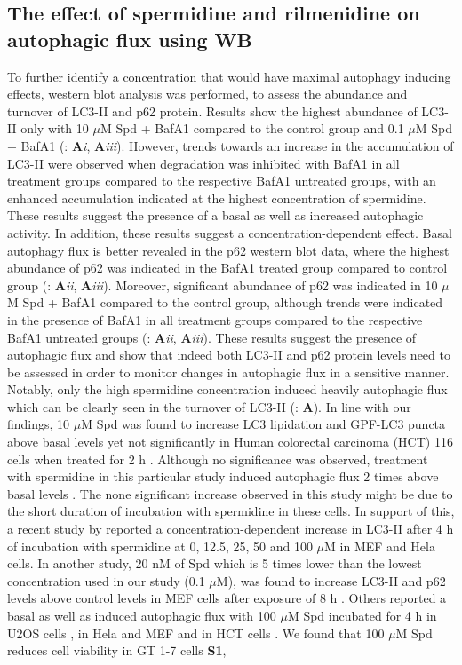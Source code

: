 {\subsection{The effect of spermidine and rilmenidine on autophagic flux using WB}
To further identify a concentration that would have maximal autophagy inducing effects, western blot analysis was performed, to assess the abundance and turnover of LC3-II and p62 protein. Results show the highest abundance of LC3-II only with 10 $\mu$M Spd + BafA1 compared to the control group and 0.1 $\mu$M Spd + BafA1 (: \textbf{A}\textit{i}, \textbf{A}\textit{iii}). However, trends towards an increase in the accumulation of LC3-II were observed when degradation was inhibited with BafA1 in all treatment groups compared to the respective BafA1 untreated groups, with an enhanced accumulation indicated at the highest concentration of spermidine. These results suggest the presence of a basal as well as increased autophagic activity. In addition, these results suggest a concentration-dependent effect. Basal autophagy flux is better revealed in the p62 western blot data, where the highest abundance of p62 was indicated in the BafA1 treated group compared to control group (: \textbf{A}\textit{ii}, \textbf{A}\textit{iii}). Moreover, significant abundance of p62 was indicated in 10 $\mu$M Spd + BafA1 compared to the control group, although trends were indicated in the presence of BafA1 in all treatment groups compared to the respective BafA1 untreated groups (: \textbf{A}\textit{ii}, \textbf{A}\textit{iii}). These results suggest the presence of autophagic flux and show that indeed both LC3-II and p62 protein levels need to be assessed in order to monitor changes in autophagic flux in a sensitive manner. Notably, only the high spermidine concentration induced heavily autophagic flux which can be clearly seen in the turnover of LC3-II (: \textbf{A}). In line with our findings, 10 $\mu$M Spd was found to increase LC3 lipidation and GPF-LC3 puncta above  basal levels yet not significantly in Human colorectal carcinoma (HCT) 116 cells when treated for 2 h \citep{Morselli2011}. Although no significance was observed, treatment with spermidine in this particular study induced autophagic flux 2 times above basal levels \citep{Morselli2011}. The none significant increase observed in this study might be due to the short duration of incubation with spermidine in these cells. In support of this, a recent study by \citet{Yue2017} reported a concentration-dependent increase in LC3-II after 4 h of incubation with spermidine at  0, 12.5, 25, 50 and 100 $\mu$M in MEF and Hela cells.  In another study, 20 nM of Spd which is 5 times lower than the lowest concentration used in our study (0.1 $\mu$M), was found to increase LC3-II and p62 levels above control levels in MEF cells after exposure of 8 h \citep{DuToit2018a}. Others reported a basal as well as induced autophagic flux with 100 $\mu$M Spd incubated for 4 h in U2OS cells  \citep{Pietrocola2015}, in Hela and MEF \citep{Yue2017} and in HCT cells \citep{Morselli2011}. We found that 100 $\mu$M Spd reduces cell viability in GT 1-7 cells \textbf{S1}, }
